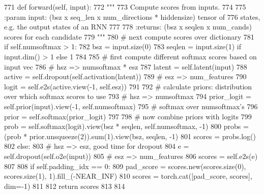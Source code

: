\begin{DoxyCode}
771     \textcolor{keyword}{def }forward(self, input):
772         \textcolor{stringliteral}{"""}
773 \textcolor{stringliteral}{        Compute scores from inputs.}
774 \textcolor{stringliteral}{}
775 \textcolor{stringliteral}{        :param input: (bsz x seq\_len x num\_directions * hiddensize) tensor of}
776 \textcolor{stringliteral}{                       states, e.g. the output states of an RNN}
777 \textcolor{stringliteral}{}
778 \textcolor{stringliteral}{        :returns: (bsz x seqlen x num\_cands) scores for each candidate}
779 \textcolor{stringliteral}{        """}
780         \textcolor{comment}{# next compute scores over dictionary}
781         \textcolor{keywordflow}{if} self.numsoftmax > 1:
782             bsz = input.size(0)
783             seqlen = input.size(1) \textcolor{keywordflow}{if} input.dim() > 1 \textcolor{keywordflow}{else} 1
784 
785             \textcolor{comment}{# first compute different softmax scores based on input vec}
786             \textcolor{comment}{# hsz => numsoftmax * esz}
787             latent = self.latent(input)
788             active = self.dropout(self.activation(latent))
789             \textcolor{comment}{# esz => num\_features}
790             logit = self.e2s(active.view(-1, self.esz))
791 
792             \textcolor{comment}{# calculate priors: distribution over which softmax scores to use}
793             \textcolor{comment}{# hsz => numsoftmax}
794             prior\_logit = self.prior(input).view(-1, self.numsoftmax)
795             \textcolor{comment}{# softmax over numsoftmax's}
796             prior = self.softmax(prior\_logit)
797 
798             \textcolor{comment}{# now combine priors with logits}
799             prob = self.softmax(logit).view(bsz * seqlen, self.numsoftmax, -1)
800             probs = (prob * prior.unsqueeze(2)).sum(1).view(bsz, seqlen, -1)
801             scores = probs.log()
802         \textcolor{keywordflow}{else}:
803             \textcolor{comment}{# hsz => esz, good time for dropout}
804             e = self.dropout(self.o2e(input))
805             \textcolor{comment}{# esz => num\_features}
806             scores = self.e2s(e)
807 
808         \textcolor{keywordflow}{if} self.padding\_idx == 0:
809             pad\_score = scores.new(scores.size(0), scores.size(1), 1).fill\_(-NEAR\_INF)
810             scores = torch.cat([pad\_score, scores], dim=-1)
811 
812         \textcolor{keywordflow}{return} scores
813 
814 
\end{DoxyCode}
\mbox{\label{classprojects_1_1controllable__dialogue_1_1controllable__seq2seq_1_1modules_1_1OutputLayer_ad744249e312a3e31d6233262afdacee5}} 
